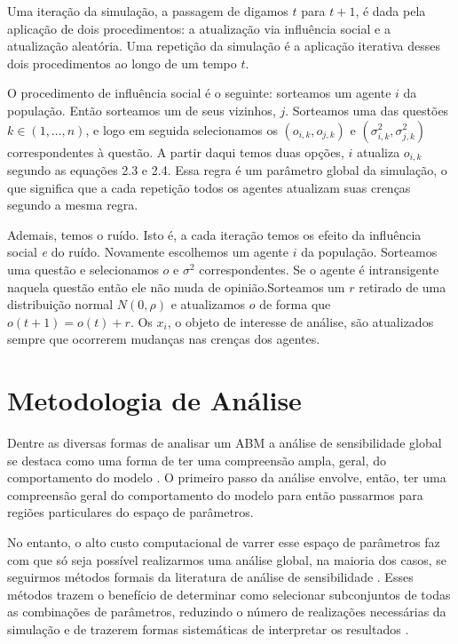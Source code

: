 Uma iteração da simulação, a passagem de digamos \(t\) para \(t+1\), é dada pela
aplicação de dois procedimentos: a atualização via influência social e a
atualização aleatória. Uma repetição da simulação é a aplicação iterativa desses
dois procedimentos ao longo de um tempo \(t \).

O procedimento de influência social é o seguinte: sorteamos um agente \(i\) da
população. Então sorteamos um de seus vizinhos, \(j\). Sorteamos uma das
questões \(k \in (1,\ldots,n)\), e logo em seguida selecionamos os
\((o_{i,k},o_{j,k})\) e \((\sigma_{i,k}^2,\sigma_{j,k}^2)\) correspondentes à questão. A
partir daqui temos duas opções, \(i\) atualiza \(o_{i,k}\) segundo as equações
2.3 e 2.4. Essa regra é um parâmetro global da simulação, o que significa que a
cada repetição todos os agentes atualizam suas crenças segundo a mesma regra.

Ademais, temos o ruído. Isto é, a cada iteração temos os efeito da influência
social \textit{e} do ruído. Novamente escolhemos um agente \(i\) da população.
Sorteamos uma questão e selecionamos \(o\) e \(\sigma^2\) correspondentes. Se o
agente é intransigente naquela questão então ele não muda de opinião.Sorteamos
um \(r\) retirado de uma distribuição normal \(N(0,\rho)\) e atualizamos \(o\) de
forma que \(o(t+1) = o(t) + r\). Os \(x_i\), o objeto de interesse de análise,
são atualizados sempre que ocorrerem mudanças nas crenças dos agentes.

\section{Metodologia de Análise}

Dentre as diversas formas de analisar um ABM a análise de sensibilidade global
se destaca como uma forma de ter uma compreensão ampla, geral, do comportamento
do modelo \cite{north2007managing}. O primeiro passo da análise envolve, então,
 ter uma compreensão geral do comportamento do modelo para então passarmos
para regiões particulares do espaço de parâmetros.

No entanto, o alto custo computacional de varrer esse espaço de parâmetros faz com
que só seja possível realizarmos uma análise global, na maioria dos casos, se
seguirmos métodos formais da literatura de análise de sensibilidade
\cite{railsback2012agent}. Esses métodos trazem o benefício de determinar como
selecionar subconjuntos de todas as combinações de parâmetros, reduzindo o
número de realizações necessárias da simulação e de trazerem formas sistemáticas
de interpretar os resultados \cite{railsback2012agent}.

